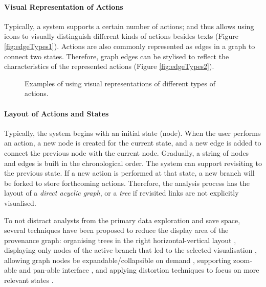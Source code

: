 \paragraph{Visual Representation of Actions}
Typically, a system supports a certain number of actions; and thus allows using icons to visually distinguish different kinds of actions besides texts \cite{Gotz2009} (Figure \ref{fig:edgeTypes1}). Actions are also commonly represented as edges in a graph to connect two states. Therefore, graph edges can be stylised to reflect the characteristics of the represented actions \cite{Ma1999} (Figure \ref{fig:edgeTypes2}).

\begin{figure}[ht]
\centering
{}
\caption{Examples of using visual representations of different types of actions.}
\label{fig:Action-Respresentation}
\end{figure}

\paragraph{Layout of Actions and States}
Typically, the system begins with an initial state (node). When the user performs an action, a new node is created for the current state, and a new edge is added to connect the previous node with the current node. Gradually, a string of nodes and edges is built in the chronological order. The system can support revisiting to the previous state. If a new action is performed at that state, a new branch will be forked to store forthcoming actions. Therefore, the analysis process has the layout of a \textit{direct acyclic graph}, or a \textit{tree} if revisited links are not explicitly visualised.

To not distract analysts from the primary data exploration and save space, several techniques have been proposed to reduce the display area of the provenance graph: organising trees in the right horizontal-vertical layout \cite{Shrinivasan2008}, displaying only nodes of the active branch that led to the selected visualisation \cite{Klemmer2002}, allowing graph nodes be expandable/collapsible on demand \cite{Bavoil2005}, supporting zoom-able and pan-able interface \cite{Dunne2012}, and applying distortion techniques to focus on more relevant states \cite{Meng1998}.

